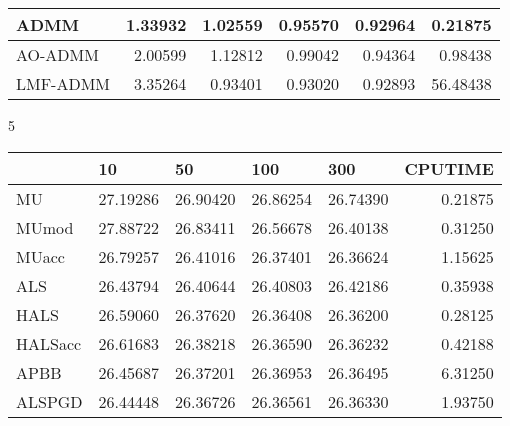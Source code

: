 \documentclass{article}
\begin{document}
\begin{table}[H]
\begin{tabular}{|l|r|r|r|r|r|}
		ADMM     & 1.33932                      & 1.02559                      & 0.95570                      & 0.92964                      & 0.21875                      \\ \hline
		AO-ADMM  & 2.00599                      & 1.12812                      & 0.99042                      & 0.94364                      & 0.98438                      \\ \hline
		LMF-ADMM & 3.35264                      & 0.93401                      & 0.93020                      & 0.92893                      & 56.48438                     \\ \hline
	\end{tabular}
\end{table}

 5 
 
 \begin{table}[H]
 	\centering
 	\begin{tabular}{|l|r|r|r|r|r|}
 		\hline
 		& \multicolumn{1}{l|}{10} & \multicolumn{1}{l|}{50} & \multicolumn{1}{l|}{100} & \multicolumn{1}{l|}{300} & \multicolumn{1}{l|}{CPUTIME} \\ \hline
 		MU       & 27.19286                & 26.90420                & 26.86254                 & 26.74390                 & 0.21875                      \\ \hline
 		MUmod    & 27.88722                & 26.83411                & 26.56678                 & 26.40138                 & 0.31250                      \\ \hline
 		MUacc    & 26.79257                & 26.41016                & 26.37401                 & 26.36624                 & 1.15625                      \\ \hline
 		ALS      & 26.43794                & 26.40644                & 26.40803                 & 26.42186                 & 0.35938                      \\ \hline
 		HALS     & 26.59060                & 26.37620                & 26.36408                 & 26.36200                 & 0.28125                      \\ \hline
 		HALSacc  & 26.61683                & 26.38218                & 26.36590                 & 26.36232                 & 0.42188                      \\ \hline
 		APBB     & 26.45687                & 26.37201                & 26.36953                 & 26.36495                 & 6.31250                      \\ \hline
 		ALSPGD   & 26.44448                & 26.36726                & 26.36561                 & 26.36330                 & 1.93750                      \\ \hline

\end{tabular}
\end{table}
\end{document}

